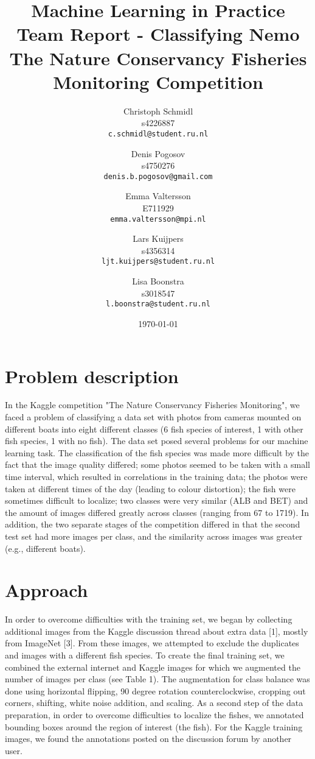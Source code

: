 \documentclass[a4paper]{article}
\title{Machine Learning in Practice\\ \vspace{1em}Team Report - Classifying Nemo\\The Nature Conservancy Fisheries Monitoring Competition\vspace{1em}}
\author{
  Christoph Schmidl\\ s4226887\\      \texttt{c.schmidl@student.ru.nl}
  \and
  Denis Pogosov\\ s4750276\\     \texttt{denis.b.pogosov@gmail.com}
  \and
  Emma Valtersson\\	E711929\\	\texttt{emma.valtersson@mpi.nl}
  \and
  Lars Kuijpers\\ s4356314\\ 		\texttt{ljt.kuijpers@student.ru.nl}
  \and
  Lisa Boonstra\\ s3018547\\		\texttt{l.boonstra@student.ru.nl}
}
\date{\today}
\begin{document}
\maketitle


\section{Problem description}

In the Kaggle competition "The Nature Conservancy Fisheries Monitoring", we faced a problem of classifying a data set with photos from cameras mounted on different boats into eight different classes (6 fish species of interest, 1 with other fish species, 1 with no fish). The data set posed several problems for our machine learning task. The classification of the fish species was made more difficult by the fact that the image quality differed; some photos seemed to be taken with a small time interval, which resulted in correlations in the training data; the photos were taken at different times of the day (leading to colour distortion); the fish were sometimes difficult to localize; two classes were very similar (ALB and BET) and the amount of images differed greatly across classes (ranging from 67 to 1719). In addition, the two separate stages of the competition differed in that the second test set had more images per class, and the similarity across images was greater (e.g., different boats).


\section{Approach}

In order to overcome difficulties with the training set, we began by collecting additional images from the Kaggle discussion thread about extra data [1], mostly from ImageNet [3]. From these images, we attempted to exclude the duplicates and images with a different fish species. To create the final training set, we combined the external internet and Kaggle images for which we augmented the number of images per class (see Table 1). The augmentation for class balance was done using horizontal flipping, 90 degree rotation counterclockwise, cropping out corners, shifting, white noise addition, and scaling. As a second step of the data preparation, in order to overcome difficulties to localize the fishes, we annotated bounding boxes around the region of interest (the fish). For the Kaggle training images, we found the annotations posted on the discussion forum by another user.
\end{document}
